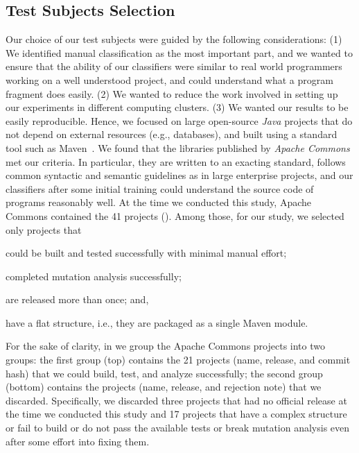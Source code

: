 \documentclass[sigconf,review,anonymous]{acmart}
\begin{document}
\subsection{Test Subjects Selection}
\label{sec:selection}
Our choice of our test subjects were guided by the following considerations:
(1) We identified manual classification as the most important part, and
we wanted to ensure that the ability of our classifiers were similar to real world
programmers working on a well understood project,
and could understand what a program fragment does easily.
(2) We wanted to reduce the work involved in setting up our experiments
in different computing clusters.
(3) We wanted our results to be easily reproducible.
Hence, we focused on large open-source \emph{Java} projects that do
not depend on
external resources (e.g., databases), and built using a standard tool such as Maven~\cite{maven}.
We found that the libraries published by \emph{Apache Commons}~\cite{commons} met our criteria.
In particular, they are written to an exacting standard, follows common syntactic
and semantic guidelines as in large enterprise projects, and our classifiers
after some initial training could understand the source code of programs reasonably well.
%
At the time we conducted this study,
Apache Commons contained the 41 projects
().
%
Among those, for our study, we selected only projects that
\begin{enumerate*}[label=(\arabic*)]
  \item could be built and tested successfully with minimal manual effort;
  \item completed mutation analysis successfully;
  \item are released more than once; and,
  \item have a flat structure, i.e., they are packaged as a single Maven module.
\end{enumerate*}

For the sake of clarity, in  we group the
Apache Commons projects into two groups:
the first group (top) contains the 21 projects (name, release, and commit hash)
that we could build, test, and analyze successfully;
the second group (bottom) contains the projects (name, release, and rejection note) that we discarded.
%
Specifically, we discarded three projects that had no official release at the time we conducted this study and 
17 projects that have a complex structure or fail to build or do not pass the available tests or break mutation analysis even after some effort into fixing them.%
\end{document}
